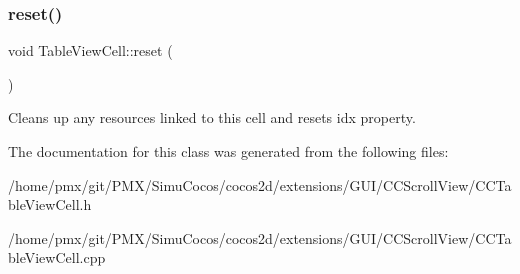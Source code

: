 \subsubsection{\texorpdfstring{reset()}{reset()}\hspace{0.1cm}{\footnotesize\ttfamily [2/2]}}
{\footnotesize\ttfamily void Table\+View\+Cell\+::reset (\begin{DoxyParamCaption}{ }\end{DoxyParamCaption})}

Cleans up any resources linked to this cell and resets {\ttfamily idx} property. 

The documentation for this class was generated from the following files\+:\begin{DoxyCompactItemize}
\item 
/home/pmx/git/\+P\+M\+X/\+Simu\+Cocos/cocos2d/extensions/\+G\+U\+I/\+C\+C\+Scroll\+View/C\+C\+Table\+View\+Cell.\+h\item 
/home/pmx/git/\+P\+M\+X/\+Simu\+Cocos/cocos2d/extensions/\+G\+U\+I/\+C\+C\+Scroll\+View/C\+C\+Table\+View\+Cell.\+cpp\end{DoxyCompactItemize}
